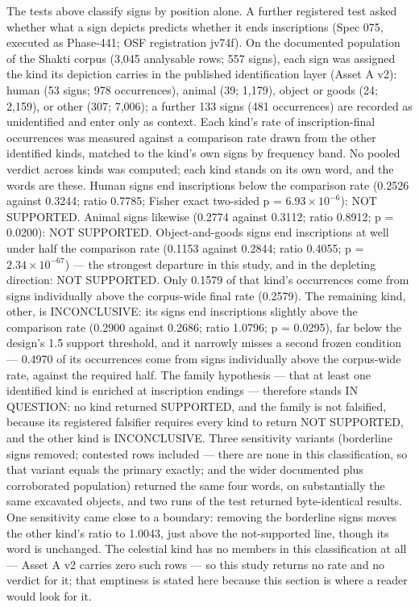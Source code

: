 \documentclass[
]{article}
\newcounter{none} %
\begin{document}
The tests above classify signs by position alone. A further
registered test asked whether what a sign depicts predicts
whether it ends inscriptions (Spec 075, executed as Phase-441;
OSF registration jv74f). On the documented population of the
Shakti corpus (3,045 analysable rows; 557 signs), each sign was
assigned the kind its depiction carries in the published
identification layer (Asset A v2): human (53 signs; 978
occurrences), animal (39; 1,179), object or goods (24; 2,159),
or other (307; 7,006); a further 133 signs (481 occurrences)
are recorded as unidentified and enter only as context. Each
kind's rate of inscription-final occurrences was measured
against a comparison rate drawn from the other identified kinds, matched to the kind's own signs by frequency band. No pooled verdict across kinds was
computed; each kind stands on its own word, and the words are
these. Human signs end inscriptions below the comparison rate
(0.2526 against 0.3244; ratio 0.7785; Fisher exact two-sided
p = $6.93 \times 10^{-6}$): NOT SUPPORTED. Animal signs
likewise (0.2774 against 0.3112; ratio 0.8912; p = 0.0200):
NOT SUPPORTED. Object-and-goods signs end inscriptions at well
under half the comparison rate (0.1153 against 0.2844; ratio
0.4055; p = $2.34 \times 10^{-67}$) --- the strongest departure in this study, and in the depleting direction: NOT SUPPORTED.
Only 0.1579 of that kind's occurrences come from signs
individually above the corpus-wide final rate (0.2579). The
remaining kind, other, is INCONCLUSIVE: its signs end
inscriptions slightly above the comparison rate (0.2900
against 0.2686; ratio 1.0796; p = 0.0295), far below the
design's 1.5 support threshold, and it narrowly misses a second
frozen condition --- 0.4970 of its occurrences come from signs
individually above the corpus-wide rate, against the required
half. The family hypothesis --- that at least one identified
kind is enriched at inscription endings --- therefore stands IN QUESTION: no kind returned SUPPORTED, and the family is not falsified, because its registered falsifier requires every kind to return NOT SUPPORTED, and the other kind is INCONCLUSIVE. Three sensitivity
variants (borderline signs removed; contested rows included
--- there are none in this classification, so that variant
equals the primary exactly; and the wider documented plus
corroborated population) returned the same four words, on
substantially the same excavated objects, and two runs of the
test returned byte-identical results. One sensitivity came
close to a boundary: removing the borderline signs moves the
other kind's ratio to 1.0043, just above the not-supported
line, though its word is unchanged. The celestial kind has no
members in this classification at all --- Asset A v2 carries
zero such rows --- so this study returns no rate and no verdict for it; that emptiness is stated here because this section is where a reader would look for it.
\end{document}
